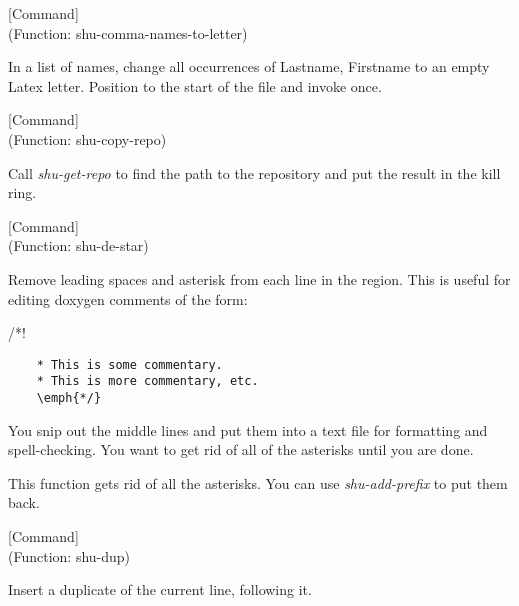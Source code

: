\vspace{1em}
\noindent
{}
\usebox{\funcname}
 \hfill [Command]\\%
 (Function: shu-comma-names-to-letter)

\begin{doc-string}
In a list of names, change all occurrences
of Lastname, Firstname to an empty Latex letter.
Position to the start of the file and invoke once.
\end{doc-string}

\vspace{1em}
\noindent
{}
\usebox{\funcname}
 \hfill [Command]\\%
 (Function: shu-copy-repo)

\begin{doc-string}
Call \emph{shu-get-repo} to find the path to the repository and put the result in
the kill ring.
\end{doc-string}

\vspace{1em}
\noindent
{}
\usebox{\funcname}
 \hfill [Command]\\%
 (Function: shu-de-star)

\begin{doc-string}
Remove leading spaces and asterisk from each line in the region.  This is
useful for editing doxygen comments of the form:

   /*!
\small{\begin{verbatim}
    * This is some commentary.
    * This is more commentary, etc.
    \emph{*/}
\end{verbatim}}

You snip out the middle lines and put them into a text file for formatting and
spell-checking.  You want to get rid of all of the asterisks until you are
done.

This function gets rid of all the asterisks.  You can use \emph{shu-add-prefix} to
put them back.
\end{doc-string}

\vspace{1em}
\noindent
{}
\usebox{\funcname}
 \hfill [Command]\\%
 (Function: shu-dup)

\begin{doc-string}
Insert a duplicate of the current line, following it.
\end{doc-string}

